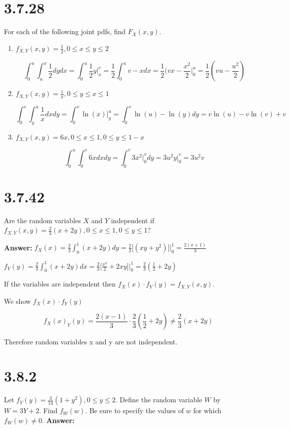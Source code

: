 \documentclass[svgnames]{article}
\begin{document}
\section{3.7.28}
For each of the following joint pdfs, find $F_X(x,y)$. 
\begin{enumerate}[label=(\alph*)]
\item $f_{X,Y}(x,y) = \frac{1}{2}, 0 \leq x \leq y \leq 2$

$$\int_{0}^{u}\int_{u}^{x} \frac{1}{2}dydx=\int_{0}^{u}\frac{1}{2}y\Big|^{v}_{x}=\frac{1}{2}\int_{0}^{u}v-xdx=\frac{1}{2}(vx-\frac{x^2}{2}\Big|^{u}_{0}=\frac{1}{2}(vu-\frac{u^2}{2})$$

\item $f_{X,Y}(x,y) = \frac{1}{x}, 0 \leq y \leq x \leq 1$

$$\int_{0}^{v}\int_{y}^{u}\frac{1}{x}dxdy = \int_{0}^{v} \ln(x) \Big|_{y}^{u}=\int_{0}^{v}\ln(u) - \ln(y)dy =v\ln(u) - v\ln(v) + v $$

\item $f_{X,Y}(x,y) = 6x, 0 \leq x \leq 1, 0 \leq y  \leq 1-x$

$$\int_{0}^{u}\int_{0}^{v} 6x dxdy = \int_{0}^{v}3x^2\Big|^{v}_{0}dy=3u^2y\Big|^{v}_{0}=3u^2v$$

\end {enumerate}

\section{3.7.42}
 Are the random variables $X$ and $Y$ independent if $f_{X,Y}(x, y) = \frac{2}{3} (x + 2y), 0 \leq x \leq 1, 0 \leq y \leq 1$?
 
 \textbf{Answer:}
 $f_{X}(x) =  \frac{2}{3} \int_{0}^{1} (x + 2y)dy = \frac{2}{3} \Big[(xy + y^2)\Big] \Big|^{1}_{0}= \frac{2(x+1)}{3}$
 
 $f_{Y}(y) =\frac{2}{3} \int_{0}^{1} (x + 2y)dx = \frac{2}{3}\Big[\frac{x^2}{2}+2xy\Big]\Big|_{0}^{1}= \frac{2}{3}( \frac{1}{2}+2y)$
 
 If the variables are independent then $f_{X}(x) \cdot f_{Y}(y) = f_{X,Y}(x, y)$.
 
 We show $f_{X}(x) \cdot f_{Y}(y)$

$$f_{X}(x)  _{Y}(y) =\frac{2(x-1)}{3}  \cdot \frac{2}{3}( \frac{1}{2}+2y) \neq \frac{2}{3}(x+2y) $$

Therefore random variables x and y are not independent. 

 
 \section{3.8.2}
Let $f_Y(y) = \frac{3}{14}(1+y^2), 0 \leq y \leq 2$. Define the random variable $W$ by $W = 3Y + 2$. Find $f_W(w)$. Be sure to specify the values of $w$ for which $f_W(w) \neq 0$. 
 \textbf{Answer:}
 
\end{document}
